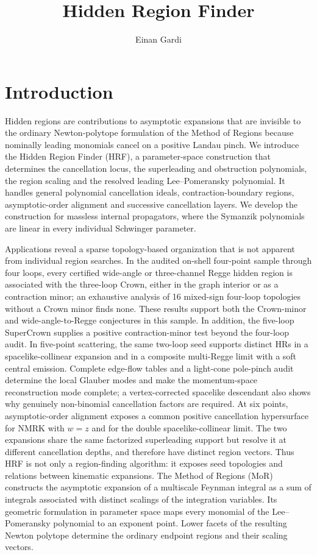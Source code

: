 \documentclass[a4paper,11pt]{article}
\title{Hidden Region Finder}
\author{Einan Gardi}
\affiliation{Higgs Centre for Theoretical Physics, School of Physics and Astronomy,\\ The University of Edinburgh, Edinburgh EH9 3FD, United Kingdom}
\begin{document}
\maketitle
\flushbottom



\section{Introduction}


Hidden regions are contributions to asymptotic expansions that are invisible
to the ordinary Newton-polytope formulation of the Method of Regions because
nominally leading monomials cancel on a positive Landau pinch.  We introduce
the Hidden Region Finder (HRF), a parameter-space construction that determines
the cancellation locus, the superleading and obstruction polynomials, the
region scaling and the resolved leading Lee--Pomeransky polynomial.  It
handles general polynomial cancellation ideals, contraction-boundary
regions, asymptotic-order alignment and successive cancellation layers.  We
develop the construction for massless internal propagators, where the
Symanzik polynomials are linear in every individual Schwinger parameter.

Applications reveal a sparse topology-based organization that is not apparent
from individual region searches.  In the audited on-shell four-point sample
through four loops, every certified wide-angle or three-channel Regge hidden
region is associated with the three-loop Crown, either in the graph interior
or as a contraction minor; an exhaustive analysis of 16 mixed-sign four-loop
topologies without a Crown minor finds none.  These results support both the
Crown-minor and wide-angle-to-Regge conjectures in this sample.  In
addition, the five-loop SuperCrown supplies a positive contraction-minor test
beyond the four-loop audit.  In five-point scattering, the same two-loop
seed supports distinct HRs in a spacelike-collinear expansion and in a
composite multi-Regge limit with a soft central emission.  Complete edge-flow
tables and a light-cone pole-pinch audit determine the local Glauber modes and
make the momentum-space reconstruction mode complete; a vertex-corrected spacelike descendant also shows why
genuinely non-binomial cancellation factors are required.
At six points, asymptotic-order alignment exposes a common positive
cancellation hypersurface for NMRK with \(w=z\) and for the double
spacelike-collinear limit.  The two expansions share the same factorized
superleading support but resolve it at different cancellation depths, and
therefore have distinct region vectors.  Thus HRF is not only a region-finding
algorithm: it exposes seed topologies and relations between kinematic
expansions.
The Method of Regions (MoR) constructs the asymptotic expansion of a
multiscale Feynman integral as a sum of integrals associated with distinct
scalings of the integration variables.  Its geometric formulation in
parameter space maps every monomial of the Lee--Pomeransky polynomial to an
exponent point.  Lower facets of the resulting Newton polytope determine the
ordinary endpoint regions and their scaling vectors.
\end{document}
